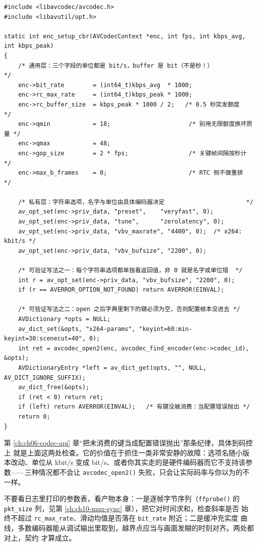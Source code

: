 \documentclass[12pt,a4paper,fontset=fandol]{ctexbook}
\newcommand{\Fn}[1]{\texttt{#1()}}
\newcommand{\Tp}[1]{\texttt{#1}}
\begin{document}
\begin{lstlisting}[style=cstyle,caption={额度契约的完整一次表达：通用字段加私有选项，并验证哪些键真的被消费},label={lst:ch07-vbv}]
#include <libavcodec/avcodec.h>
#include <libavutil/opt.h>

static int enc_setup_cbr(AVCodecContext *enc, int fps, int kbps_avg, int kbps_peak)
{
    /* 通用层：三个字段的单位都是 bit/s，buffer 是 bit（不是秒！）          */
    enc->bit_rate        = (int64_t)kbps_avg  * 1000;
    enc->rc_max_rate     = (int64_t)kbps_peak * 1000;
    enc->rc_buffer_size  = kbps_peak * 1000 / 2;   /* 0.5 秒突发额度       */
    enc->qmin            = 18;                      /* 别用无限额度换坏质量 */
    enc->qmax            = 48;
    enc->gop_size        = 2 * fps;                 /* 关键帧间隔按秒计     */
    enc->max_b_frames    = 0;                       /* RTC 侧不做重排       */

    /* 私有层：字符串选项，名字与单位由具体编码器决定                       */
    av_opt_set(enc->priv_data, "preset",    "veryfast", 0);
    av_opt_set(enc->priv_data, "tune",      "zerolatency", 0);
    av_opt_set(enc->priv_data, "vbv_maxrate", "4400", 0);  /* x264: kbit/s */
    av_opt_set(enc->priv_data, "vbv_bufsize", "2200", 0);

    /* 可验证写法之一：每个字符串选项都单独看返回值，非 0 就是名字或单位错  */
    int r = av_opt_set(enc->priv_data, "vbv_bufsize", "2200", 0);
    if (r == AVERROR_OPTION_NOT_FOUND) return AVERROR(EINVAL);

    /* 可验证写法之二：open 之后字典里剩下的键必须为空，否则配置根本没进去 */
    AVDictionary *opts = NULL;
    av_dict_set(&opts, "x264-params", "keyint=60:min-keyint=30:scenecut=40", 0);
    int ret = avcodec_open2(enc, avcodec_find_encoder(enc->codec_id), &opts);
    AVDictionaryEntry *left = av_dict_get(opts, "", NULL, AV_DICT_IGNORE_SUFFIX);
    av_dict_free(&opts);
    if (ret < 0) return ret;
    if (left) return AVERROR(EINVAL);   /* 有键没被消费：当配置错误抛出 */
    return 0;
}
\end{lstlisting}

第 \ref{ch:ch06-codec-api} 章``把未消费的键当成配置错误抛出''那条纪律，具体到码控上
就是上面这两处检查。它的价值在于抓住一类非常安静的故障：选项名随小版本改动、单位从
kbit/s 变成 bit/s、或者你其实走的是硬件编码器而它不支持该参数——三种情况都不会让
\Fn{avcodec\_open2} 失败，只会让实际码率与你以为的不一样。

\begin{note}[title={验证一条额度设置是否生效，只看两样东西}]
不要看日志里打印的参数表，看产物本身：一是逐帧字节序列（\Fn{ffprobe} 的
\Tp{pkt\_size} 列，见第 \ref{ch:ch10-mux-sync} 章），把它对时间求和，检查斜率是否
始终不超过 \Tp{rc\_max\_rate}、滑动均值是否落在 \Tp{bit\_rate} 附近；二是缓冲充实度
曲线，多数编码器能从调试输出里取到，越界点应当与画面发糊的时刻对齐。两处都对上，契约
才算成立。
\end{note}
\end{document}
